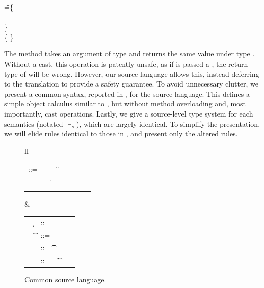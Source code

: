 \documentclass[a4paper,USenglish]{tex/lipics-v2016}
\begin{document}
\begin{tabbing}
\hspace{1cm}\K\HS \Call{\New\C{}}\m{\New\D{}} \HS\HS\HS\WHERE\HS
  \K\HS =\HS \= \class\= \C \{\\
       \> \HS \Mdef\m\x\any\C{\HS\x\HS}\\
       \> \}  \\
       \>\class \D \{ \}
\end{tabbing}         

\noindent The method \m takes an argument of type \any and returns the same
value under type \C. Without a cast, this operation is patently unsafe, as
if \m is passed a \D, the return type of \m will be wrong. However, our
source language allows this, instead deferring to the translation to provide
a safety guarantee.  To avoid unnecessary clutter, we present a common
syntax, reported in , for the source language. This
defines a simple object calculus similar to \kafka, but without method
overloading and, most importantly, cast operations. Lastly, we give a
source-level type system for each semantics (notated $\vdash_{\!s}$), which
are largely identical. To simplify the presentation, we will elide rules
identical to those in \kafka, and present only the altered rules.

\begin{figure}[!h]\hrulefill
	
	\begin{tabular}{ll}
		\begin{minipage}{6cm}\begin{tabular}{@{}l@{~}l@{}l@{}l@{}l@{}l@{}l@{}l}
				\e\hspace{.1cm} ::= & \hspace{.2cm} \x        
				&\B \this         
				&\B \FRead\f \\    
				&
				&\B \FWrite\f\e
				&\B \Call\e\m\e \\
				& 
				&\B \that      
				&\B \New\C{\e[1]..}  
		\end{tabular}\end{minipage}&
		\begin{minipage}{5cm}\begin{tabular}{l@{~}l@{}l@{}l}
				~ \k &::= \Class \C {\fd[1]..}{\md[1]..} \\
				~ \t&::= ~ \any  \B   \C  \\ 
				\md &::= \Mdef\m\x\t\t\e \\
				~\fd&::= ~ \Fdef\f\t \\ 
		\end{tabular}\end{minipage} 
	\end{tabular}
	\vspace{2mm} 

\hrulefill

        \caption{Common source language.}\label{f:sourcesyntax}
\end{figure}
\end{document}
